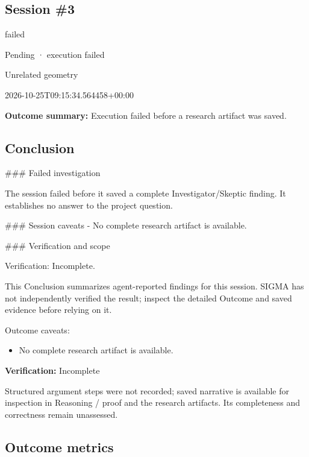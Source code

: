 \documentclass[11pt]{article}
\begin{document}
\subsection{Session \#3}
\begin{description}[style=nextline,font=\normalfont\bfseries,leftmargin=0pt,labelsep=0pt]
\item[Execution status] failed
\item[Outcome] Pending · execution failed
\item[Strategy] Unrelated geometry
\item[Started] 2026-10-25T09:15:34.564458+00:00
\end{description}
\textbf{Outcome summary:} Execution failed before a research artifact was saved.\par
\subsection{Conclusion}
\#\#\# Failed investigation

The session failed before it saved a complete Investigator/Skeptic finding. It establishes no answer to the project question.

\#\#\# Session caveats
- No complete research artifact is available.

\#\#\# Verification and scope

Verification: Incomplete.

This Conclusion summarizes agent-reported findings for this session. SIGMA has not independently verified the result; inspect the detailed Outcome and saved evidence before relying on it.\par
Outcome caveats:\par
\begin{itemize}
\item No complete research artifact is available.
\end{itemize}
\textbf{Verification:} Incomplete\par
Structured argument steps were not recorded; saved narrative is available for inspection in Reasoning / proof and the research artifacts. Its completeness and correctness remain unassessed.\par
\subsection{Outcome metrics}
\end{document}
